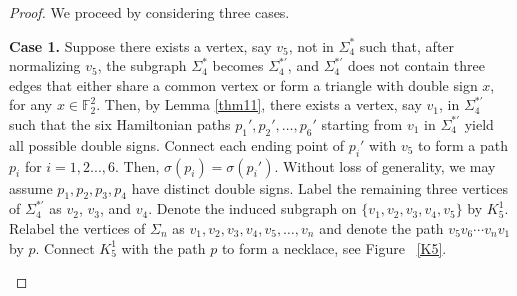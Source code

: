 \documentclass[12pt]{amsart}
\theoremstyle{plain}
\theoremstyle{definition}%
\begin{document}
\begin{proof}
We proceed by considering three cases.

\medskip

\textbf{Case 1.} Suppose there exists a vertex, say \(v_5\), not in \(\Sigma_4^*\) such that, after normalizing \(v_5\), the subgraph \(\Sigma_4^*\) becomes \(\Sigma_4^{*'}\), and \(\Sigma_4^{*'}\) does not contain three edges that either share a common vertex or form a triangle with double sign \(x\), for any \(x \in \mathbb{F}_2^2\).
 Then, by Lemma \ref{thm11}, there exists a vertex, say \(v_1\), in \(\Sigma_4^{*'}\) such that the six Hamiltonian paths \(p_1', p_2', \ldots, p_6'\) starting from \(v_1\) in \(\Sigma_4^{*'}\) yield all possible double signs. Connect each ending point of $p_i'$ with $v_5$ to form a path $p_i$ for $i=1,2...,6$. Then, $\sigma(p_i)=\sigma(p_i')$. 
Without loss of generality, we may assume $p_1,p_2,p_3,p_4$ have distinct double signs.  Label the remaining three vertices of $\Sigma_4^{*'}$ as \(v_2\), \(v_3\), and \(v_4\). Denote the induced subgraph on \(\{v_1,v_2,v_3,v_4,v_5\}\) by \(K_5^1\). Relabel the vertices of \(\Sigma_n\) as \(v_1,v_2,v_3,v_4,v_5,\dots,v_n\) and denote the path \(v_5v_6 \cdots v_nv_1\) by \(p\). Connect $K_5^1$ with the path $p$ to form a necklace, see Figure ~\ref{K5}.

\begin{figure}[H]
    \centering
{}
\end{figure}
\end{proof}
\end{document}

